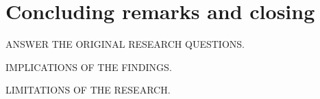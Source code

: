 \chapter{Concluding remarks and closing}%
\label{ch:conclusion}

ANSWER THE ORIGINAL RESEARCH QUESTIONS.

IMPLICATIONS OF THE FINDINGS.

LIMITATIONS OF THE RESEARCH.
